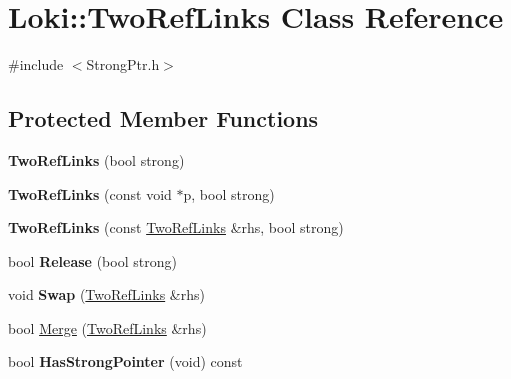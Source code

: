 \hypertarget{classLoki_1_1TwoRefLinks}{}\section{Loki\+:\+:Two\+Ref\+Links Class Reference}
\label{classLoki_1_1TwoRefLinks}


{\ttfamily \#include $<$Strong\+Ptr.\+h$>$}

\subsection*{Protected Member Functions}
\begin{DoxyCompactItemize}
\item 
\hypertarget{classLoki_1_1TwoRefLinks_a07244e9a9aff805d203159cd3aacaf45}{}{\bfseries Two\+Ref\+Links} (bool strong)\label{classLoki_1_1TwoRefLinks_a07244e9a9aff805d203159cd3aacaf45}

\item 
\hypertarget{classLoki_1_1TwoRefLinks_aa28f7de2066134f7c95416eef7928bd2}{}{\bfseries Two\+Ref\+Links} (const void $\ast$p, bool strong)\label{classLoki_1_1TwoRefLinks_aa28f7de2066134f7c95416eef7928bd2}

\item 
\hypertarget{classLoki_1_1TwoRefLinks_a35ba6a0ec4c9000cf2a2ddea3c089d6b}{}{\bfseries Two\+Ref\+Links} (const \hyperlink{classLoki_1_1TwoRefLinks}{Two\+Ref\+Links} \&rhs, bool strong)\label{classLoki_1_1TwoRefLinks_a35ba6a0ec4c9000cf2a2ddea3c089d6b}

\item 
\hypertarget{classLoki_1_1TwoRefLinks_a31af527274d8fceac6ba9808bd06ea17}{}bool {\bfseries Release} (bool strong)\label{classLoki_1_1TwoRefLinks_a31af527274d8fceac6ba9808bd06ea17}

\item 
\hypertarget{classLoki_1_1TwoRefLinks_ad3851d3d6df4ebd459e02245bca6f0ef}{}void {\bfseries Swap} (\hyperlink{classLoki_1_1TwoRefLinks}{Two\+Ref\+Links} \&rhs)\label{classLoki_1_1TwoRefLinks_ad3851d3d6df4ebd459e02245bca6f0ef}

\item 
bool \hyperlink{classLoki_1_1TwoRefLinks_afa3b914b3e13f0bdefa9304fae430d3f}{Merge} (\hyperlink{classLoki_1_1TwoRefLinks}{Two\+Ref\+Links} \&rhs)
\item 
\hypertarget{classLoki_1_1TwoRefLinks_a35049f103a134b1a9c06c957e50479e6}{}bool {\bfseries Has\+Strong\+Pointer} (void) const \label{classLoki_1_1TwoRefLinks_a35049f103a134b1a9c06c957e50479e6}


\end{DoxyCompactItemize}
